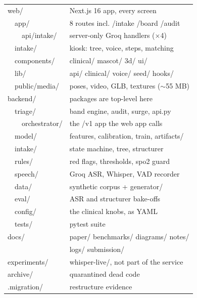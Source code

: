 \documentclass[10pt,a4paper,twocolumn]{article}
\begin{document}
\begin{tcolorbox}[mpcode]
\begin{tabular}{@{}l@{\hspace{1.0em}}l@{}}
\color{White}web/            & \color{AccPurple!35!white}Next.js 16 app, every screen\\
\color{White}\ \ app/        & \color{AccPurple!35!white}8 routes incl. /intake /board /audit\\
\color{White}\ \ \ \ api/intake/ & \color{AccPurple!35!white}server-only Groq handlers ($\times$4)\\
\color{White}\ \ intake/     & \color{AccPurple!35!white}kiosk: tree, voice, steps, matching\\
\color{White}\ \ components/ & \color{AccPurple!35!white}clinical/ mascot/ 3d/ ui/\\
\color{White}\ \ lib/        & \color{AccPurple!35!white}api/ clinical/ voice/ seed/ hooks/\\
\color{White}\ \ public/media/ & \color{AccPurple!35!white}poses, video, GLB, textures ($\sim$55 MB)\\
\color{White}backend/        & \color{AccPurple!35!white}packages are top-level here\\
\color{White}\ \ triage/     & \color{AccPurple!35!white}band engine, audit, surge, api.py\\
\color{White}\ \ \ \ orchestrator/ & \color{AccPurple!35!white}the /v1 app the web app calls\\
\color{White}\ \ model/      & \color{AccPurple!35!white}features, calibration, train, artifacts/\\
\color{White}\ \ intake/     & \color{AccPurple!35!white}state machine, tree, structurer\\
\color{White}\ \ rules/      & \color{AccPurple!35!white}red flags, thresholds, spo2 guard\\
\color{White}\ \ speech/     & \color{AccPurple!35!white}Groq ASR, Whisper, VAD recorder\\
\color{White}\ \ data/       & \color{AccPurple!35!white}synthetic corpus + generator/\\
\color{White}\ \ eval/       & \color{AccPurple!35!white}ASR and structurer bake-offs\\
\color{White}\ \ config/     & \color{AccPurple!35!white}the clinical knobs, as YAML\\
\color{White}\ \ tests/      & \color{AccPurple!35!white}pytest suite\\
\color{White}docs/           & \color{AccPurple!35!white}paper/ benchmarks/ diagrams/ notes/\\
 & \color{AccPurple!35!white}logs/ submission/\\
\color{White}experiments/    & \color{AccPurple!35!white}whisper-live/, not part of the service\\
\color{White}archive/        & \color{AccPurple!35!white}quarantined dead code\\
\color{White}.migration/     & \color{AccPurple!35!white}restructure evidence\\
\end{tabular}
\end{tcolorbox}
\end{document}
